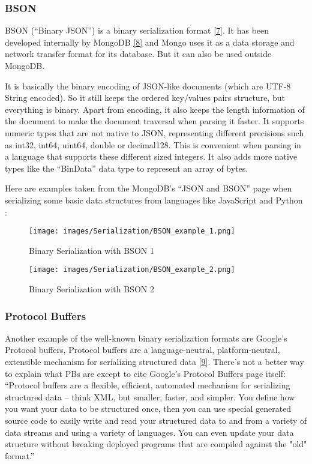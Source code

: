\documentclass[12pt]{article}
\begin{document}
\subsubsection{BSON}
BSON (“Binary JSON”) is a binary serialization format \href{http://bsonspec.org/spec.html}{[7]}. It has been developed internally by MongoDB \href{https://www.mongodb.com/json-and-bson}{[8]} and Mongo uses it as a data storage and network transfer format for its database. But it can also be used outside MongoDB.

It is basically the binary encoding of JSON-like documents (which are UTF-8 String encoded). So it still keeps the ordered key/values pairs structure, but everything is binary. Apart from encoding, it also keeps the length information of the document to make the document traversal when parsing it faster. It supports numeric types that are not native to JSON, representing different precisions such as int32, int64, uint64, double or decimal128. This is convenient when parsing in a language that supports these different sized integers.  It also adds more native types like the “BinData” data type to represent an array of bytes.  

Here are examples taken from the MongoDB’s “JSON and BSON” page when serializing some basic data structures from languages like JavaScript and Python :

\begin{figure}[ht!]
 	\centering
 	\caption{Binary Serialization with BSON 1}
 	\texttt{[image: images/Serialization/BSON\_example\_1.png]}
 	\label{lab:perceptron}
\end{figure}

\begin{figure}[ht!]
 	\centering
 	\caption{Binary Serialization with BSON 2}
 	\texttt{[image: images/Serialization/BSON\_example\_2.png]}
 	\label{lab:perceptron}
\end{figure}

\subsubsection{Protocol Buffers}
Another example of the well-known binary serialization formats are Google’s Protocol buffers, Protocol buffers are a language-neutral, platform-neutral, extensible mechanism for serializing structured data \href{https://developers.google.com/protocol-buffers}{[9]}. There’s not a better way to explain what PBs are except to cite Google’s Protocol Buffers page itself: “Protocol buffers are a flexible, efficient, automated mechanism for serializing structured data – think XML, but smaller, faster, and simpler. You define how you want your data to be structured once, then you can use special generated source code to easily write and read your structured data to and from a variety of data streams and using a variety of languages. You can even update your data structure without breaking deployed programs that are compiled against the "old" format.”
\end{document}
